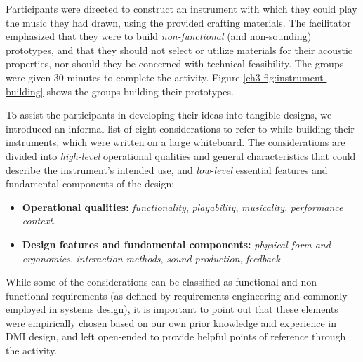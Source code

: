 \documentclass[letterpaper, 12pt]{article}
\begin{document}
Participants were directed to construct an instrument with which they could play the music they had drawn, using the provided crafting materials. The facilitator emphasized that they were to build \emph{non-functional} (and non-sounding) prototypes, and that they should not select or utilize materials for their acoustic properties, nor should they be concerned with technical feasibility. The groups were given 30 minutes to complete the activity. Figure \ref{ch3-fig:instrument-building} shows the groups building their prototypes.



To assist the participants in developing their ideas into tangible designs, we introduced an informal list of eight considerations to refer to while building their instruments, which were written on a large whiteboard. The considerations are divided into \emph{high-level} operational qualities and general characteristics that could describe the instrument's intended use, and \emph{low-level} essential features and fundamental components of the design: 

\begin{itemize}[noitemsep]
    \item \textbf{Operational qualities:} \emph{functionality}, \emph{playability}, \emph{musicality}, \emph{performance context}. 
    \item \textbf{Design features and fundamental components:} \emph{physical form and ergonomics}, \emph{interaction methods}, \emph{sound production}, \emph{feedback}
\end{itemize}

While some of the considerations can be classified as functional and non-functional requirements (as defined by requirements engineering \citep{Glinz2007} and commonly employed in systems design), it is important to point out that these elements were empirically chosen based on our own prior knowledge and experience in DMI design, and left open-ended to provide helpful points of reference through the activity. 
\end{document}

